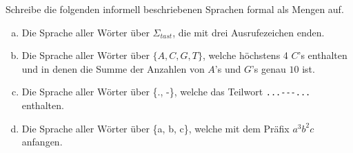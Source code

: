 %
%
Schreibe die folgenden informell beschriebenen Sprachen formal als Mengen auf.


\begin{enumerate}[(a)]
    \item Die Sprache aller Wörter über \(\Sigma_{tast}\), die mit drei Ausrufezeichen enden.\\
    {

    \blank[width=\linewidth]{}}

    \item Die Sprache aller Wörter über \(\{A, C, G, T\}\), welche höchstens 4 \(C\)'s enthalten und in denen die Summe der Anzahlen von \(A\)'s und \(G\)'s genau \(10\) ist. \\
    {

    \blank[width=\linewidth]{}}

    \item Die Sprache aller Wörter über \{., -\}, welche das Teilwort \verb|...---...| enthalten. \\
    {

    \blank[width=\linewidth]{}}

    \item Die Sprache aller Wörter über \{a, b, c\}, welche mit dem Präfix \(a^3 b^2 c\) anfangen. \\
    {

    \blank[width=\linewidth]{}}
\end{enumerate}
